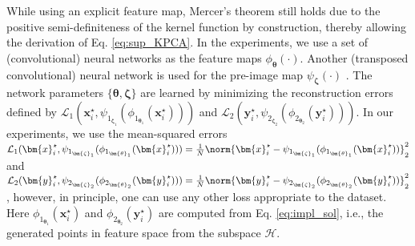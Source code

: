 \documentclass[preview,border=0.3pt]{standalone}
\begin{document}
While using an explicit feature map, Mercer's theorem still holds due to the positive  semi-definiteness of the kernel function by construction, thereby allowing the derivation of Eq. \ref{eq:sup_KPCA}. In the experiments, we use a set of (convolutional) neural networks as the feature maps $\phi_{\bm{\theta}}(\cdot)$. Another (transposed convolutional) neural network is used for the pre-image map $\psi_{\bm{\zeta}}(\cdot)$ \cite{dumoulin2016guide}. The network parameters $\{\bm{\theta},\bm{\zeta}\}$ are learned by minimizing the reconstruction errors defined by $ \mathcal{L}_1(\bm{x}_i^\star,\psi_{1_{\bm{\zeta}_{1}}} (\phi_{1_{\bm{\theta}_{1}}} (\bm{x}_i^\star)))$ and $\mathcal{L}_2(\bm{y}_i^\star,\psi_{2_{\bm{\zeta}_{2}}} (\phi_{2_{\bm{\theta}_{2}}} (\bm{y}_i^\star)))$. In our experiments, we use the mean-squared errors $\mathcal{L}_1(\bm{x}_i^\star,\psi_{1_{\bm{\zeta}_{1}}} (\phi_{1_{\bm{\theta}_{1}}} (\bm{x}_i^\star))) =  \frac{1}{N} \norm{\bm{x}^\star_i - \psi_{1_{\bm{\zeta}_{1}}} (\phi_{1_{\bm{\theta}_{1}}} (\bm{x}_i^\star))}^{2}_2$ and $\mathcal{L}_2(\bm{y}_i^\star,\psi_{2_{\bm{\zeta}_{2}}} (\phi_{2_{\bm{\theta}_{2}}} (\bm{y}_i^\star))) =  \frac{1}{N} \norm{\bm{y}^\star_i - \psi_{2_{\bm{\zeta}_{2}}} (\phi_{2_{\bm{\theta}_{2}}} (\bm{y}_i^\star))}^{2}_2$, however, in principle, one can use any other loss appropriate to the dataset.
Here $\phi_{1_{\bm{\theta}_{1}}} (\bm{x}_i^\star)$ and $\phi_{2_{\bm{\theta}_{2}}} (\bm{y}_i^\star)$ are computed from Eq. \ref{eq:impl_sol}, i.e., the generated points in feature space from the subspace $\mathcal{H}$.
\end{document}
